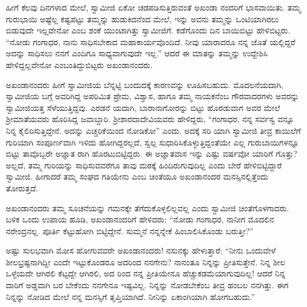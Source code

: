 ಹೀಗೆ ಕೆಲವು ದಿನಗಳಾದ ಮೇಲೆ, ಸ್ವಾಮೀಜಿ ಏಕೋ ಚಡಪಡಿಸುತ್ತಿರುವಂತೆ ಅಖಂಡಾ ನಂದರಿಗೆ ಭಾಸವಾಯಿತು. ತಮ್ಮ ಗುರುಭಾಯಿ ಅಷ್ಟೆಲ್ಲ ಕಷ್ಟಪಟ್ಟು ತಮ್ಮನ್ನು ಹುಡುಕಿದನೆಂದ ಮೇಲೆ, ಇನ್ನು ಅವನು ತಮ್ಮನ್ನು ಒಂಟಿಯಾಗಿರಲು ಬಿಡುವುದೇ ಇಲ್ಲವೇನೋ ಎಂಬ ಶಂಕೆ ಯುಂಟಾಗಿತ್ತು ಸ್ವಾಮೀಜಿಗೆ. ಕಡೆಗೊಂದು ದಿನ ಬಾಯಿಬಿಟ್ಟು ಹೇಳಿಬಿಟ್ಟರು. “ನೋಡು ಗಂಗಾಧರ, ನಾನು ಸಾಧಿಸಬೇಕಾದ ಮಹಾಕಾರ್ಯವೊಂದಿದೆ. ನೀವು ಯಾರಾದರೂ ನನ್ನ ಜೊತೆ ಯಲ್ಲಿದ್ದರೆ ಅದನ್ನು ಸಾಧಿಸಲು ನನಗೆ ಎಂದಿಗೂ ಸಾಧ್ಯವಾಗುವುದೇ ಇಲ್ಲ.” ಆದರೆ ಈ ಮಾತನ್ನು ತಮ್ಮನ್ನು ಉದ್ದೇಶಿಸಿ ಹೇಳಿದ್ದಲ್ಲವೇನೋ ಎಂಬಂತಿದ್ದುಬಿಟ್ಟರು ಅಖಂಡಾನಂದರು.

ಅಖಂಡಾನಂದರು ಹೀಗೆ ಸ್ವಾಮೀಜಿಯ ಬೆನ್ನಟ್ಟಿ ಬಂದುದಕ್ಕೆ ಕಾರಣವನ್ನು ಊಹಿಸಬಹುದು. ಮೊದಲನೆಯದಾಗಿ, ಸ್ವಾಮೀಜಿಯ ಬಗ್ಗೆ ಅವರಿಗಿದ್ದ ಅಪರಿಮಿತ ಪ್ರೇಮ, ವಿಶ್ವಾಸ, ಹಾಗೂ ತಮ್ಮ ನಾಯಕನೆಂಬ ಗೌರವಾದರಗಳು ಅವರನ್ನು ಸ್ವಾಮೀಜಿಯತ್ತ ಸೆಳೆಯುತ್ತಿದ್ದವು. ಎರಡನೆ ಯದಾಗಿ, ಬಾರಾನಾಗೋರನ್ನು ಬಿಟ್ಟು ಹೊರಡುವಾಗ ಅವರ ಮೇಲೆ ಶ್ರೀಮಾತೆಯವರು ಹೊರಿಸಿದ್ದ ಜವಾಬ್ದಾರಿ. ಶ್ರೀಶಾರದಾದೇವಿಯವರು ಹೇಳಿದ್ದರು, “ಗಂಗಾಧರ, ನನ್ನ ಸರ್ವಸ್ವ ವನ್ನೂ ನಿನ್ನ ಕೈಲಿರಿಸುತ್ತಿದ್ದೇನೆ. ಅದನ್ನು ಎಚ್ಚರಿಕೆಯಿಂದ ನೋಡಿಕೋ” ಎಂದು. ಅದಕ್ಕೆ ಸರಿ ಯಾಗಿ ಸ್ವಾಮೀಜಿ ತೀವ್ರ ಕಾಯಿಲೆಗೆ ಗುರಿಯಾಗಿ ಸಂಪೂರ್ಣವಾಗಿ ಇಳಿದು ಹೋಗಿದ್ದರಲ್ಲದೆ, ಸ್ವಲ್ಪ ಸುಧಾರಿಸಿಕೊಳ್ಳುತ್ತಿದ್ದಂತೆಯೇ ಎಲ್ಲ ಗುರುಬಾಯಿಗಳನ್ನೂ ಬಿಟ್ಟು ತಾವೊಬ್ಬರೇ ಅಜ್ಞಾತ ರಾಗಿ ಹೊರಟುಬಿಟ್ಟಿದ್ದರು. ಈ ಅಜ್ಞಾತವಾಸ ಇನ್ನು ಎಷ್ಟು ವರ್ಷವೋ ಯಾರಿಗೆ ಗೊತ್ತು? ಅಲ್ಲದೆ, ತಮ್ಮ ಗುರಿಯನ್ನು ಸಾಧಿಸುವವರೆಗೂ ತಾವು ಮಠಕ್ಕೆ ಹಿಂದಿರುಗುವುದಿಲ್ಲ ಎಂದು ಬೇರೆ ಹೇಳಿಬಿಟ್ಟಿದ್ದಾರೆ ಸ್ವಾಮೀಜಿ. ಹೀಗಾದರೆ ತಮ್ಮ ಸಂಘದ ಗತಿಯೇನು ಎಂಬ ಚಿಂತೆಯೂ ಅಖಂಡಾನಂದರ ಮನಸ್ಸಿನಲ್ಲಿತ್ತೆಂದು ತೋರುತ್ತದೆ.

ಅಖಂಡಾನಂದರು ತಮ್ಮ ಸೂಚನೆಯನ್ನು ಗಮನಕ್ಕೇ ತೆಗೆದುಕೊಳ್ಳಲಿಲ್ಲವಲ್ಲ ಎಂದು ಸ್ವಾಮೀಜಿ ಚಿಂತೆಗೊಳಗಾದರು. ಬಳಿಕ ಒಂದು ಉಪಾಯ ಹೂಡಿ, ಅಖಂಡಾನಂದರಿಗೆ ಹೇಳಿದರು: “ನೋಡು ಗಂಗಾಧರ, ನಾನೀಗ ಮೊದಲಿನ ನರೇಂದ್ರನಲ್ಲ. ಪೂರ್ತಿ ಕೆಟ್ಟುಹೋಗಿ ಬಿಟ್ಟಿದ್ದೇನೆ. ಸುಮ್ಮನೆ ನನ್ನನ್ನೇಕೆ ಹಿಂಬಾಲಿಸಿಕೊಂಡು ಬರುತ್ತೀ?”

ಅಷ್ಟು ಸುಲಭವಾಗಿ ಮೋಸ ಹೋಗುವವರೇ ಅಖಂಡಾನಂದರು! ನಸುನಕ್ಕು ಹೇಳುತ್ತಾರೆ: “ನೀನು ಒಂದುವೇಳೆ ಶೀಲಭ್ರಷ್ಟನಾಗಿದ್ದೀ ಎಂದೇ ಇಟ್ಟುಕೊಂಡರೂ ಅದರಿಂದ ನನಗೇನು? ನಾನಂತೂ ನಿನ್ನನ್ನು ಪ್ರೀತಿಸುತ್ತೇನೆ. ನಿನ್ನ ಶೀಲ ಒಳ್ಳೆಯದೇ ಆಗಿರಲಿ ಕೆಟ್ಟದ್ದೇ ಆಗಿರಲಿ, ಅದ ರಿಂದ ನನ್ನ ಪ್ರೀತಿಯೇನೂ ಹೆಚ್ಚುಕಡಮೆಯಾಗುವುದಿಲ್ಲ! ಆದರೆ ನಿನ್ನ ದಾರಿಗೆ ಅಡ್ಡವಾಗಿ ಬರ ಬೇಕೆಂದು ನನಗೇನೂ ಇಷ್ಟವಿಲ್ಲ. ನಿನ್ನನ್ನು ನೋಡಬೇಕೆಂಬ ತೀವ್ರ ಹಂಬಲ ನನಗಿತ್ತು. ಈಗ ನಿನ್ನನ್ನು ನೋಡಿದ ಮೇಲೆ ನನ್ನ ಮನಸ್ಸಿಗೆ ತೃಪ್ತಿಯಾಗಿದೆ. ನೀನಿನ್ನು ಏಕಾಂಗಿಯಾಗಿ ಹೋಗಬಹುದು.”


